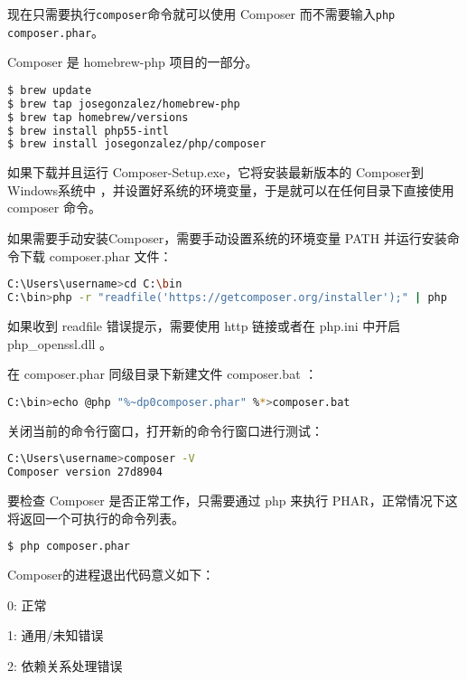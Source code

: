 现在只需要执行\texttt{composer}命令就可以使用 Composer 而不需要输入\texttt{php composer.phar}。

Composer 是 homebrew-php 项目的一部分。

\begin{lstlisting}[language=bash]
$ brew update
$ brew tap josegonzalez/homebrew-php
$ brew tap homebrew/versions
$ brew install php55-intl
$ brew install josegonzalez/php/composer
\end{lstlisting}

如果下载并且运行 Composer-Setup.exe，它将安装最新版本的 Composer到Windows系统中 ，并设置好系统的环境变量，于是就可以在任何目录下直接使用 composer 命令。

如果需要手动安装Composer，需要手动设置系统的环境变量 PATH 并运行安装命令下载 composer.phar 文件：

\begin{lstlisting}[language=bash]
C:\Users\username>cd C:\bin
C:\bin>php -r "readfile('https://getcomposer.org/installer');" | php
\end{lstlisting}

如果收到 readfile 错误提示，需要使用 http 链接或者在 php.ini 中开启 php\_openssl.dll 。

在 composer.phar 同级目录下新建文件 composer.bat ：

\begin{lstlisting}[language=bash]
C:\bin>echo @php "%~dp0composer.phar" %*>composer.bat
\end{lstlisting}

关闭当前的命令行窗口，打开新的命令行窗口进行测试：

\begin{lstlisting}[language=bash]
C:\Users\username>composer -V
Composer version 27d8904
\end{lstlisting}

要检查 Composer 是否正常工作，只需要通过 php 来执行 PHAR，正常情况下这将返回一个可执行的命令列表。

\begin{lstlisting}[language=bash]
$ php composer.phar
\end{lstlisting}

Composer的进程退出代码意义如下：

\begin{compactitem}
\item 0: 正常
\item 1: 通用/未知错误
\item 2: 依赖关系处理错误
\end{compactitem}


